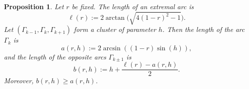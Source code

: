 \documentclass[JEP,XML,SOM,Unicode,NoFloatCountersInSection]{cedram}
\theoremstyle{plain}
\newtheorem{proposition}[theorem]{Proposition}
\theoremstyle{definition}
\let\B\Gamma
\begin{document}
\begin{proposition}\label{prop-clu} Let $r$ be fixed. The length of an extremal arc is
\begin{equation}\label{statement-l}
\ell(r):=2 \arctan\bigl(\sqrt{4(1-r)^2-1}\bigr).
\end{equation}
Let $(\B_{k-1}, \B_k, \B_{k+1})$ form a cluster of parameter $h$. Then the length of the arc $\B_k$ is
\begin{equation}\label{statement-a}
a(r,h):=2 \arcsin((1-r)\sin(h)),
\end{equation}
and the length of the opposite arcs $\B_{k\pm 1}$ is
\begin{equation}\label{statement-b}
b(r,h):=h + \frac{\ell(r)-a(r,h)}{2}.
\end{equation}
Moreover, $b(r,h)\geq a(r,h)$.
\end{proposition}
\end{document}
